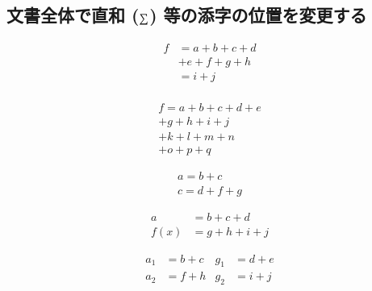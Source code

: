 \subsection{文書全体で直和 ($\protect\sum$) 等の添字の位置を変更する}
%

\begin{inout}
\begin{equation}
\begin{split}
  f & = a + b + c + d \\
    & + e + f + g + h \\
    & = i + j \\
\end{split} 
\end{equation} 
\end{inout}

\begin{inout}
\begin{multline}
f = a + b + c + d + e \\
   + g + h + i + j \\
   + k + l + m + n \\
   + o + p + q 
\end{multline} 
\end{inout}

\begin{inout}
\begin{gather}
a = b + c \\
c = d + f + g
\end{gather} 
\end{inout}

\begin{inout}
\begin{align}
   a &= b + c + d \\
f(x) &= g + h + i + j
\end{align} 
\end{inout}

\begin{inout}
\begin{align}
  a_1 &= b + c & g_1 &= d + e \\
  a_2 &= f + h & g_2 &= i + j 
\end{align} 
\end{inout}

